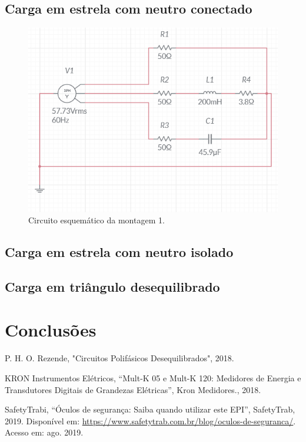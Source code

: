\documentclass[a4paper,12pt,oneside,openany,table,xcdraw]{article}
\begin{document}
\subsection{Carga em estrela com neutro conectado}
\begin{figure}[H]
\centering
\includegraphics[width=13.5cm]{m1-esquema}
\caption{Circuito esquemático da montagem 1.}
\label{m1:esquema}
\end{figure}

\subsection{Carga em estrela com neutro isolado}

\subsection{Carga em triângulo desequilibrado}

\section{Conclusões} %


\newpage
\begin{thebibliography}{9} 
    P. H. O. Rezende,
    "Circuitos Polifásicos Desequilibrados", 2018.

    KRON Instrumentos Elétricos,
    “Mult-K 05 e Mult-K 120: Medidores de Energia e Transdutores Digitais de Grandezas Elétricas”, Kron Medidores., 2018.


    SafetyTrabi,
    “Óculos de segurança: Saiba quando utilizar este EPI”, SafetyTrab, 2019.
 Disponível em:
 \url{https://www.safetytrab.com.br/blog/oculos-de-seguranca/}. Acesso em: ago. 2019.


\end{thebibliography}
\end{document}
